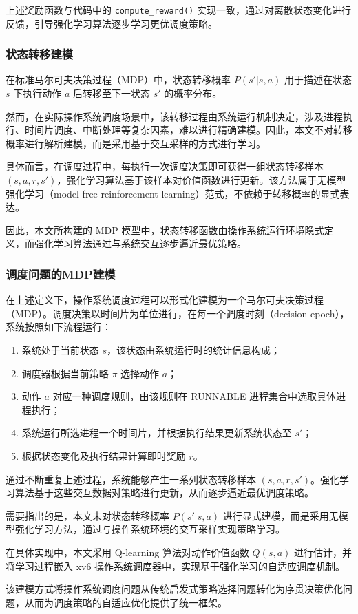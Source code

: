 上述奖励函数与代码中的 \texttt{compute\_reward()} 实现一致，通过对离散状态变化进行反馈，引导强化学习算法逐步学习更优调度策略。

\subsubsection{状态转移建模}

在标准马尔可夫决策过程（MDP）中，状态转移概率 $P(s'|s,a)$ 用于描述在状态 $s$ 下执行动作 $a$ 后转移至下一状态 $s'$ 的概率分布。

然而，在实际操作系统调度场景中，该转移过程由系统运行机制决定，涉及进程执行、时间片调度、中断处理等复杂因素，难以进行精确建模。因此，本文不对转移概率进行解析建模，而是采用基于交互采样的方式进行学习。

具体而言，在调度过程中，每执行一次调度决策即可获得一组状态转移样本 $(s,a,r,s')$，强化学习算法基于该样本对价值函数进行更新。该方法属于无模型强化学习（model-free reinforcement learning）范式，不依赖于转移概率的显式表达。

因此，本文所构建的 MDP 模型中，状态转移函数由操作系统运行环境隐式定义，而强化学习算法通过与系统交互逐步逼近最优策略。

\subsubsection{调度问题的MDP建模}

在上述定义下，操作系统调度过程可以形式化建模为一个马尔可夫决策过程（MDP）。调度决策以时间片为单位进行，在每一个调度时刻（decision epoch），系统按照如下流程运行：

\begin{enumerate}
\item 系统处于当前状态 $s$，该状态由系统运行时的统计信息构成；
\item 调度器根据当前策略 $\pi$ 选择动作 $a$；
\item 动作 $a$ 对应一种调度规则，由该规则在 RUNNABLE 进程集合中选取具体进程执行；
\item 系统运行所选进程一个时间片，并根据执行结果更新系统状态至 $s'$；
\item 根据状态变化及执行结果计算即时奖励 $r$。
\end{enumerate}

通过不断重复上述过程，系统能够产生一系列状态转移样本 $(s,a,r,s')$。强化学习算法基于这些交互数据对策略进行更新，从而逐步逼近最优调度策略。

需要指出的是，本文未对状态转移概率 $P(s'|s,a)$ 进行显式建模，而是采用无模型强化学习方法，通过与操作系统环境的交互采样实现策略学习。

在具体实现中，本文采用 Q-learning 算法对动作价值函数 $Q(s,a)$ 进行估计，并将学习过程嵌入 xv6 操作系统调度器中，实现基于强化学习的自适应调度机制。

该建模方式将操作系统调度问题从传统启发式策略选择问题转化为序贯决策优化问题，从而为调度策略的自适应优化提供了统一框架。
